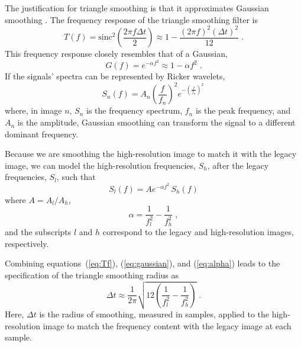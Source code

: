 The justification for triangle smoothing is that it approximates
Gaussian smoothing \cite[]{pvi}. The frequency response of the triangle smoothing filter \cite[]{pvi} is
\begin{equation}
\label{eq:Tf}
T(f) = \mathrm{sinc}^2\left(\frac{2\pi f \Delta t}{2}\right) \approx 1-\frac{(2\pi f)^2(\Delta t)^2}{12}\;.
\end{equation}
This frequency response closely resembles that of a Gaussian,
\begin{equation}
\label{eq:gaussian}
G(f) = e^{-\alpha f^2} \approx 1 - \alpha f^2\;.
\end{equation}
If the signals' spectra can be represented by Ricker wavelets,
\begin{equation} 
\label{eq:Sn}
S_{n}(f) = A_{n} \left(\frac{f}{f_{n}}\right)^2e^{-\left(\frac{f}{f_{n}}\right)^{2}}\,
\end{equation}
where, in image $n$, $S_n$ is the frequency spectrum, $f_n$ is the peak frequency, and $A_n$ is the amplitude, Gaussian smoothing can transform the signal to a different dominant frequency.

Because we are smoothing the high-resolution image to match it with the legacy image, we can model the high-resolution frequencies, $S_h$, after the legacy frequencies, $S_l$, such that 
\begin{equation} 
\label{eq:smooth}
S_{l}(f)=A e^{-\alpha f^2}\,S_h(f)      
\end{equation}
where $A=A_l/A_h$,
\begin{equation}
\label{eq:alpha}
\alpha = \frac{1}{f_l^2}-\frac{1}{f_h^2} \;,
\end{equation}
and the subscripts $l$ and $h$ correspond to the legacy and high-resolution images, respectively.

Combining equations~(\ref{eq:Tf}), (\ref{eq:gaussian}), and (\ref{eq:alpha}) leads to the specification of the triangle smoothing radius as
\begin{equation}
\label{eq:radius}
\Delta t \approx \frac{1}{2\pi}\sqrt{12\left(\frac{1}{f_{l}^{2}}-\frac{1}{f_{h}^{2}}\right)}\;.
\end{equation}
Here, $\Delta t$ is the radius of smoothing, measured in samples,
applied to the high-resolution image to match the frequency content with the legacy image
at each sample. 

